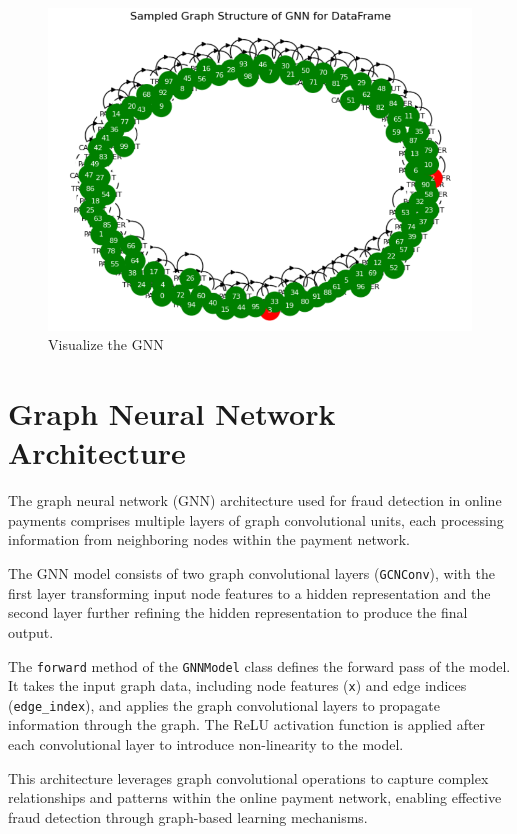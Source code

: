 \begin{figure}[H]
	\centering
	\includegraphics[width=0.7\linewidth]{chap4/5}
	\caption{Visualize the GNN}
	\label{fig:5}
\end{figure}


\section{Graph Neural Network Architecture}
\hspace{\parindent}
The graph neural network (GNN) architecture used for fraud detection in online payments comprises multiple layers of graph convolutional units, each processing information from neighboring nodes within the payment network.

The GNN model consists of two graph convolutional layers (\texttt{GCNConv}), with the first layer transforming input node features to a hidden representation and the second layer further refining the hidden representation to produce the final output.

The \texttt{forward} method of the \texttt{GNNModel} class defines the forward pass of the model. It takes the input graph data, including node features (\texttt{x}) and edge indices (\texttt{edge\_index}), and applies the graph convolutional layers to propagate information through the graph. The ReLU activation function is applied after each convolutional layer to introduce non-linearity to the model.

This architecture leverages graph convolutional operations to capture complex relationships and patterns within the online payment network, enabling effective fraud detection through graph-based learning mechanisms.

